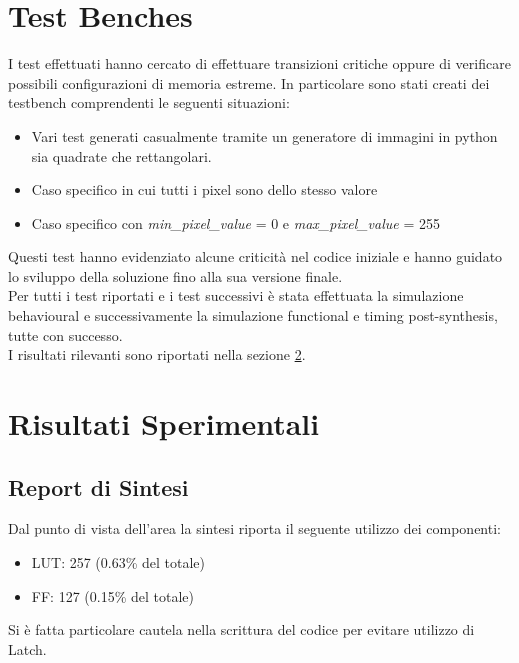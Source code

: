 \documentclass{article}
\begin{document}

\section{Test Benches}
\label{test}

I test effettuati hanno cercato di effettuare transizioni critiche oppure di verificare possibili configurazioni di memoria estreme. In particolare sono stati creati dei testbench
comprendenti le seguenti situazioni:

\begin{itemize}
\item Vari test generati casualmente tramite un generatore di immagini in python sia quadrate che rettangolari.
\item Caso specifico in cui tutti i pixel sono dello stesso valore
\item Caso specifico con \textit{min\_pixel\_value} = 0 e \textit{max\_pixel\_value} = 255
\end{itemize}

Questi test hanno evidenziato alcune criticità nel codice iniziale e hanno guidato lo sviluppo della soluzione fino alla sua versione finale.\\

Per tutti i test riportati e i test successivi è stata effettuata la simulazione behavioural e successivamente la simulazione functional e timing post-synthesis, tutte con successo.\\

I risultati rilevanti sono riportati nella sezione \ref{risultati}.

\section{Risultati Sperimentali}
\label{risultati}

\subsection{Report di Sintesi}

Dal punto di vista dell'area la sintesi riporta il seguente utilizzo dei componenti:
\begin{itemize}
\item LUT: 257 (0.63\% del totale)
\item FF: 127 (0.15\% del totale)
\end{itemize}
Si è fatta particolare cautela nella scrittura del codice per evitare utilizzo di Latch.
\end{document}
